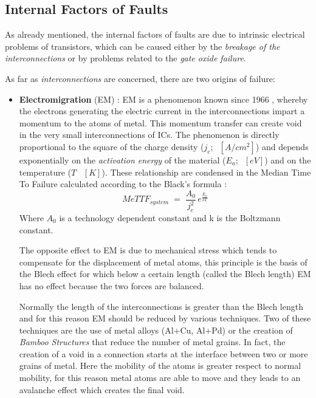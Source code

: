 {{		\subsection{Internal Factors of Faults}{
			As already mentioned, the internal factors of faults are due to intrinsic electrical problems of transistors, which can be caused either by the \textit{breakage of the interconnections} or by problems related to the \textit{gate oxide failure}.
			
			As far as \textit{interconnections} are concerned, there are two origins of failure:
			\begin{itemize}
				\item \textbf{Electromigration} (EM) : EM is a phenomenon known since 1966 , whereby the electrons generating the electric current in the interconnections impart a momentum to the atoms of metal. This momentum transfer can create void in the very small interconnections of ICs. The phenomenon is directly proportional to the square of the charge density ($j_e;\;\; [A/cm^2]$) and depends exponentially on the \textit{activation energy} of the material ($E_a;\;\;[eV]$) and on the temperature ($T \;\;\;[K]$). These relationship are condensed in the Median Time To Failure calculated according to the Black's formula :	
				\begin{equation}
					MeTTF_{system} \;=\; \frac{A_0}{j_e^2}\,e^{\frac{E_a}{kT}} 
				\end{equation}
				Where $A_0$ is a technology dependent constant and k is the Boltzmann constant. 
				
				The opposite effect to EM is due to mechanical stress which tends to compensate for the displacement of metal atoms, this principle is the basis of the Blech effect for which below a certain length (called the Blech length) EM has no effect because the two forces are balanced.
				
				Normally the length of the interconnections is greater than the Blech length and for this reason EM should be reduced by various techniques. Two of these techniques are the use of metal alloys (Al+Cu, Al+Pd) or the creation of \textit{Bamboo Structures} that reduce the number of metal grains. In fact, the creation of a void in a connection starts at the interface between two or more grains of metal. Here the mobility of the atoms is greater respect to normal mobility, for this reason metal atoms are able to move  and they leads to an avalanche effect which creates the final void.	\\
				

\end{itemize}}}}
